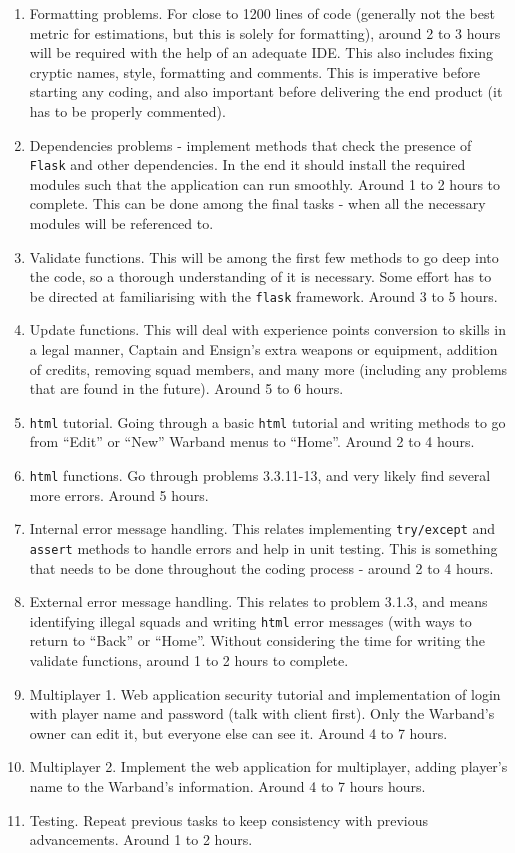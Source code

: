 \documentclass[12pt,a4paper]{article}
\begin{document}
\begin{enumerate}
 \item Formatting problems. For close to 1200 lines of code (generally not the best metric for estimations, but this is solely for formatting), around 2 to 3 hours will be required with the help of an adequate IDE. This also includes fixing cryptic names, style, formatting and comments. This is imperative before starting any coding, and also important before delivering the end product (it has to be properly commented).
 \item Dependencies problems - implement methods that check the presence of \texttt{Flask} and other dependencies. In the end it should install the required modules such that the application can run smoothly. Around 1 to 2 hours to complete. This can be done among the final tasks - when all the necessary modules will be referenced to.
 \item Validate functions. This will be among the first few methods to go deep into the code, so a thorough understanding of it is necessary. Some effort has to be directed at familiarising with the \texttt{flask} framework. Around 3 to 5 hours.
 \item Update functions. This will deal with experience points conversion to skills in a legal manner, Captain and Ensign's extra weapons or equipment, addition of credits, removing squad members, and many more (including any problems that are found in the future). Around 5 to 6 hours. 
 \item \texttt{html} tutorial. Going through a basic \texttt{html} tutorial and writing methods to go from ``Edit'' or ``New'' Warband menus to ``Home''. Around 2 to 4 hours.
 \item \texttt{html} functions. Go through problems 3.3.11-13, and very likely find several more errors. Around 5 hours.
 \item Internal error message handling. This relates implementing \texttt{try/except} and \texttt{assert} methods to handle errors and help in unit testing. This is something that needs to be done throughout the coding process - around 2 to 4 hours.
 \item External error message handling. This relates to problem 3.1.3, and means identifying illegal squads and writing \texttt{html} error messages (with ways to return to ``Back'' or ``Home''. Without considering the time for writing the validate functions, around 1 to 2 hours to complete.
 \item Multiplayer 1. Web application security tutorial and implementation of login with player name and password (talk with client first). Only the Warband's owner can edit it, but everyone else can see it. Around 4 to 7 hours.
 \item Multiplayer 2. Implement the web application for multiplayer, adding player's name to the Warband's information. Around 4 to 7 hours hours.
 \item Testing. Repeat previous tasks to keep consistency with previous advancements. Around 1 to 2 hours.
\end{enumerate}
\end{document}
